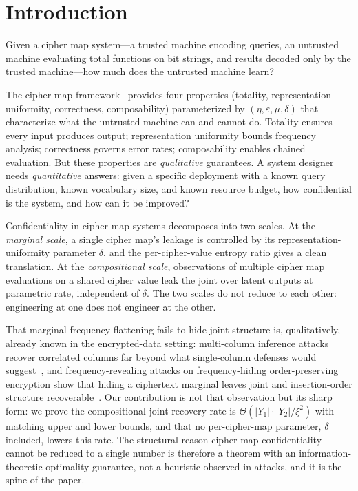 \documentclass[conference]{IEEEtran}
\theoremstyle{definition}
\theoremstyle{plain}
\theoremstyle{remark}
\begin{document}
\section{Introduction}
\label{sec:intro}

Given a cipher map system---a trusted machine encoding queries, an
untrusted machine evaluating total functions on bit strings, and results
decoded only by the trusted machine---how much does the untrusted machine
learn?

The cipher map framework~\cite{towell2026cipher} provides four properties
(totality, representation uniformity, correctness, composability)
parameterized by $(\eta, \varepsilon, \mu, \delta)$ that characterize
what the untrusted machine can and cannot do.  Totality ensures every
input produces output; representation uniformity bounds frequency
analysis; correctness governs error rates; composability enables chained
evaluation.  But these properties are \emph{qualitative} guarantees.  A
system designer needs \emph{quantitative} answers: given a specific
deployment with a known query distribution, known vocabulary size, and
known resource budget, how confidential is the system, and how can it be
improved?

Confidentiality in cipher map systems
decomposes into two scales.  At the \emph{marginal scale}, a single
cipher map's leakage is controlled by its representation-uniformity
parameter $\delta$, and the per-cipher-value entropy ratio gives a
clean translation.  At the \emph{compositional scale}, observations of
multiple cipher map evaluations on a shared cipher value leak the
joint over latent outputs at parametric rate, independent of $\delta$.
The two scales do not reduce to each other: engineering at one does
not engineer at the other.

That marginal frequency-flattening fails to hide joint structure is,
qualitatively, already known in the encrypted-data setting: multi-column
inference attacks recover correlated columns far beyond what
single-column defenses would suggest~\cite{bindschaedler2018tao}, and
frequency-revealing attacks on frequency-hiding order-preserving
encryption show that hiding a ciphertext marginal leaves joint and
insertion-order structure recoverable~\cite{cao2023frequency}.  Our
contribution is not that observation but its sharp form: we prove the
compositional joint-recovery rate is
$\Theta(|Y_1|\cdot|Y_2|/\xi^2)$ with matching upper and lower bounds,
and that no per-cipher-map parameter, $\delta$ included, lowers this rate.
The structural reason cipher-map confidentiality cannot be reduced to
a single number is therefore a theorem with an information-theoretic
optimality guarantee, not a heuristic observed in attacks, and it is
the spine of the paper.
\end{document}
